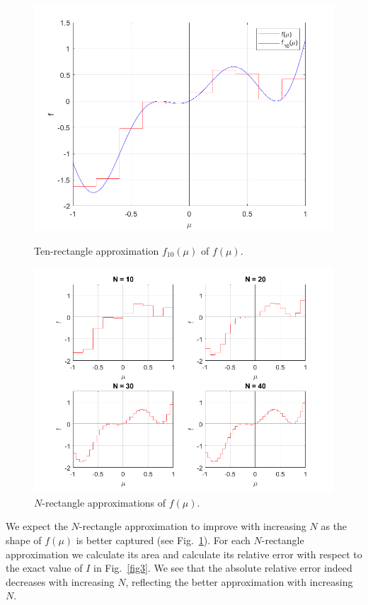\documentclass{article}
\begin{document}
\begin{figure}[h!]
	\centering
	\begin{minipage}{0.5\textwidth}
		\centering
		\includegraphics[width=1\textwidth]{images/fig1.png}
		\caption{Ten-rectangle approximation $f_{10}(\mu)$ of $f(\mu)$.}
		\label{fig1}
	\end{minipage}\hfill
	\begin{minipage}{0.5\textwidth}
		\centering
		\includegraphics[width=1\textwidth]{images/fig2.png}
		\caption{$N$-rectangle approximations of $f(\mu)$.}
		\label{fig2}
	\end{minipage}
\end{figure}
We expect the $N$-rectangle approximation to improve with increasing $N$ as the shape of $f(\mu)$ is better captured (see Fig.~\ref{fig2}). For each $N$-rectangle approximation we calculate its area and calculate its relative error with respect to the exact value of $I$ in Fig.~\ref{fig3}. We see that the absolute relative error indeed decreases with increasing $N$, reflecting the better approximation with increasing $N$.
\end{document}
